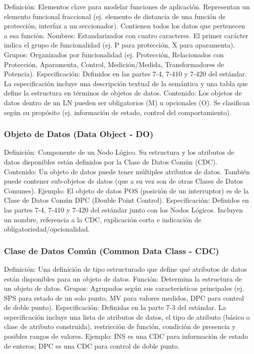 \documentclass[a5paper]{book}%
\begin{document}
    Definición: Elementos clave para modelar funciones de aplicación. Representan un elemento funcional fraccional (ej. elemento de distancia de una función de protección, interfaz a un seccionador). Contienen todos los datos que pertenecen a esa función.
    Nombres: Estandarizados con cuatro caracteres. El primer carácter indica el grupo de funcionalidad (ej. P para protección, X para aparamenta).
    Grupos: Organizados por funcionalidad (ej. Protección, Relacionados con Protección, Aparamenta, Control, Medición/Medida, Transformadores de Potencia).
    Especificación: Definidos en las partes 7-4, 7-410 y 7-420 del estándar. La especificación incluye una descripción textual de la semántica y una tabla que define la estructura en términos de objetos de datos.
    Contenido: Los objetos de datos dentro de un LN pueden ser obligatorios (M) u opcionales (O). Se clasifican según su propósito (ej. información de estado, control del comportamiento).

\subsubsection{Objeto de Datos (Data Object - DO)}

    Definición: Componente de un Nodo Lógico. Su estructura y los atributos de datos disponibles están definidos por la Clase de Datos Común (CDC).
    Contenido: Un objeto de datos puede tener múltiples atributos de datos. También puede contener sub-objetos de datos (que a su vez son de otras Clases de Datos Comunes).
    Ejemplo: El objeto de datos POS (posición de un interruptor) es de la Clase de Datos Común DPC (Double Point Control).
    Especificación: Definidos en las partes 7-4, 7-410 y 7-420 del estándar junto con los Nodos Lógicos. Incluyen un nombre, referencia a la CDC, explicación corta e indicación de obligatoriedad/opcionalidad.

\subsubsection{Clase de Datos Común (Common Data Class - CDC)}

    Definición: Una definición de tipo estructurado que define qué atributos de datos están disponibles para un objeto de datos.
    Función: Determina la estructura de un objeto de datos.
    Grupos: Agrupados según sus características principales (ej. SPS para estado de un solo punto, MV para valores medidos, DPC para control de doble punto).
    Especificación: Definidas en la parte 7-3 del estándar. La especificación incluye una lista de atributos de datos, el tipo de atributo (básico o clase de atributo construida), restricción de función, condición de presencia y posibles rangos de valores.
    Ejemplo: INS es una CDC para información de estado de enteros; DPC es una CDC para control de doble punto.
\end{document}
